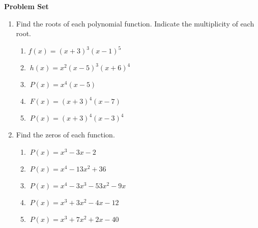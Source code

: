 \textbf{Problem Set}

\vspce
\begin{enumerate}[label = \Alph*. ]

\item 
Find the roots of each polynomial function. Indicate the multiplicity of each root.  


\begin{enumerate}[label = \arabic*. ]

\item \hspce ${f(x) = (x+3)^3(x-1)^5} $
\vspce
\item \hspce $\ {h(x) = x^2(x-5)^3(x+6)^4}$
\vspce
\item \hspce $\ {P(x) = x^4(x-5)}$
\vspce
\item \hspce $\ {F(x) = (x+3)^4(x-7)}$
\vspce
\item \hspce $\ {P(x) = (x+3)^4(x-3)^4}$


\end{enumerate}


\item
Find the zeros of each function. 

\begin{enumerate}[label = \arabic*. ]
\item \hspce $\ {P(x) = x^3-3x-2}$
\vspce
\item \hspce $\ {P(x) = x^4-13x^2+36}$
\vspce
\item \hspce $\ {P(x) = x^4-3x^3-53x^2-9x}$
\vspce
\item \hspce $\ {P(x) = x^3+3x^2-4x-12}$
\vspce
\item \hspce $\ {P(x) = x^3+7x^2+2x-40}$
\end{enumerate}  
 
\end{enumerate}